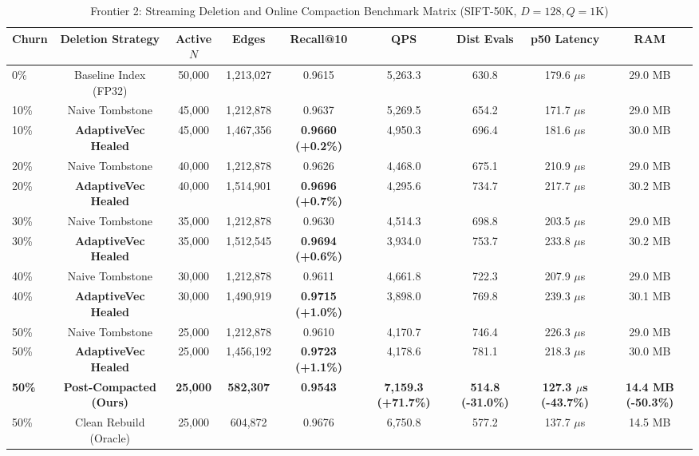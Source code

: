 \documentclass[conference,10pt]{IEEEtran}
\begin{document}
\begin{table}[t]
\caption{Frontier 2: Streaming Deletion and Online Compaction Benchmark Matrix (SIFT-50K, $D=128, Q=1\text{K}$)}
\label{tab:streaming_deletions}
\centering
\begin{tabular}{lcccccccc}
\toprule
\textbf{Churn} & \textbf{Deletion Strategy} & \textbf{Active $N$} & \textbf{Edges} & \textbf{Recall@10} & \textbf{QPS} & \textbf{Dist Evals} & \textbf{p50 Latency} & \textbf{RAM} \\
\midrule
0\% & Baseline Index (FP32) & 50,000 & 1,213,027 & 0.9615 & 5,263.3 & 630.8 & 179.6 $\mu$s & 29.0 MB \\
\midrule
10\% & Naive Tombstone & 45,000 & 1,212,878 & 0.9637 & 5,269.5 & 654.2 & 171.7 $\mu$s & 29.0 MB \\
10\% & \textbf{AdaptiveVec Healed} & 45,000 & 1,467,356 & \textbf{0.9660 (+0.2\%)} & 4,950.3 & 696.4 & 181.6 $\mu$s & 30.0 MB \\
\midrule
20\% & Naive Tombstone & 40,000 & 1,212,878 & 0.9626 & 4,468.0 & 675.1 & 210.9 $\mu$s & 29.0 MB \\
20\% & \textbf{AdaptiveVec Healed} & 40,000 & 1,514,901 & \textbf{0.9696 (+0.7\%)} & 4,295.6 & 734.7 & 217.7 $\mu$s & 30.2 MB \\
\midrule
30\% & Naive Tombstone & 35,000 & 1,212,878 & 0.9630 & 4,514.3 & 698.8 & 203.5 $\mu$s & 29.0 MB \\
30\% & \textbf{AdaptiveVec Healed} & 35,000 & 1,512,545 & \textbf{0.9694 (+0.6\%)} & 3,934.0 & 753.7 & 233.8 $\mu$s & 30.2 MB \\
\midrule
40\% & Naive Tombstone & 30,000 & 1,212,878 & 0.9611 & 4,661.8 & 722.3 & 207.9 $\mu$s & 29.0 MB \\
40\% & \textbf{AdaptiveVec Healed} & 30,000 & 1,490,919 & \textbf{0.9715 (+1.0\%)} & 3,898.0 & 769.8 & 239.3 $\mu$s & 30.1 MB \\
\midrule
50\% & Naive Tombstone & 25,000 & 1,212,878 & 0.9610 & 4,170.7 & 746.4 & 226.3 $\mu$s & 29.0 MB \\
50\% & \textbf{AdaptiveVec Healed} & 25,000 & 1,456,192 & \textbf{0.9723 (+1.1\%)} & 4,178.6 & 781.1 & 218.3 $\mu$s & 30.0 MB \\
\midrule
\textbf{50\%} & \textbf{Post-Compacted (Ours)} & \textbf{25,000} & \textbf{582,307} & \textbf{0.9543} & \textbf{7,159.3 (+71.7\%)} & \textbf{514.8 (-31.0\%)} & \textbf{127.3 $\mu$s (-43.7\%)} & \textbf{14.4 MB (-50.3\%)} \\
50\% & Clean Rebuild (Oracle) & 25,000 & 604,872 & 0.9676 & 6,750.8 & 577.2 & 137.7 $\mu$s & 14.5 MB \\
\bottomrule
\end{tabular}
\end{table}
\end{document}
